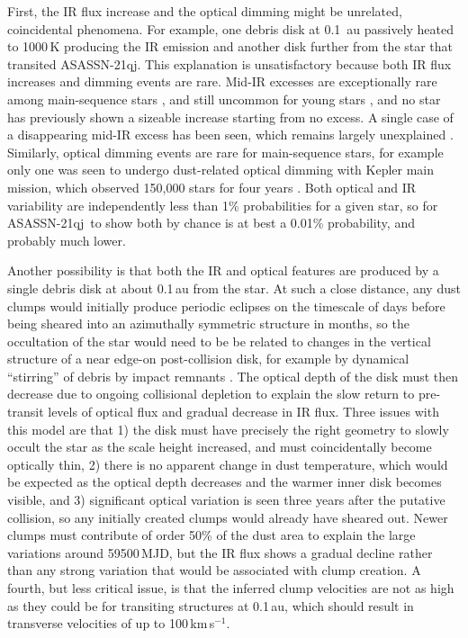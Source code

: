 \documentclass[sn-nature]{sn-jnl}%
\newcommand{\asas}{ASASSN-21qj}
\begin{document}
First, the IR flux increase and the optical dimming might be unrelated, coincidental phenomena. 
%
For example, one debris disk at 0.1~au passively heated to 1000\,K producing the IR emission and another disk further from the star that transited \asas.
%
This explanation is unsatisfactory because both IR flux increases and dimming events are rare.
%
Mid-IR excesses are exceptionally rare among main-sequence stars \cite[1:10,000,][]{2013MNRAS.433.2334K}, and still uncommon for young stars \cite[1:100,][]{2013MNRAS.433.2334K}, and no star has previously shown a sizeable increase starting from no excess. A single case of a disappearing mid-IR excess has been seen, which remains largely unexplained \cite{2012Natur.487...74M}.
%
Similarly, optical dimming events are rare for main-sequence stars, for example only one was seen to undergo dust-related optical dimming with Kepler main mission, which observed 150,000 stars for four years \cite{2016MNRAS.457.3988B}.
%
Both optical and IR variability are independently less than 1\% probabilities for a given star, so for \asas~to show both by chance is at best a 0.01\% probability, and probably much lower.

Another possibility is that both the IR and optical features are produced by a single debris disk at about 0.1\,au from the star.
%
At such a close distance, any dust clumps would initially produce periodic eclipses on the timescale of days \citep{2019MNRAS.488.4465G} before being sheared into an azimuthally symmetric structure in months, so the occultation of the star would need to be be related to changes in the vertical structure of a near edge-on post-collision disk, for example by dynamical ``stirring'' of debris by impact remnants \cite{1992Icar...96..107I}.
%
The optical depth of the disk must then decrease due to ongoing collisional depletion to explain the slow return to pre-transit levels of optical flux and gradual decrease in IR flux.
%
Three issues with this model are that 1) the disk must have precisely the right geometry to slowly occult the star as the scale height increased, and must coincidentally become optically thin, 2) there is no apparent change in dust temperature, which would be expected as the optical depth decreases and the warmer inner disk becomes visible, and 3) significant optical variation is seen three years after the putative collision, so any initially created clumps would already have sheared out.
%
Newer clumps must contribute of order 50\% of the dust area to explain the large variations around 59500\,MJD, but the IR flux shows a gradual decline rather than any strong variation that would be associated with clump creation.
%
A fourth, but less critical issue, is that the inferred clump velocities are not as high as they could be for transiting structures at 0.1\,au, which should result in transverse velocities of up to 100\,km\,s$^{-1}$.
\end{document}
